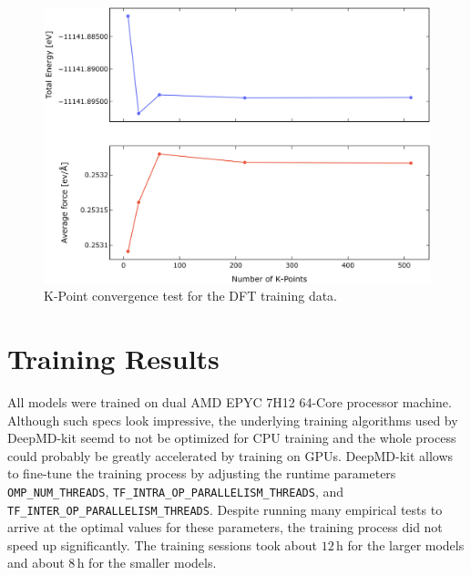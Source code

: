 \begin{figure}
  \begin{center}
    \includegraphics[width=.8\textwidth]{
      asset/kpoint_convergence.jpg
    }
  \end{center}
  \caption{K-Point convergence test for the DFT training data.}
  \label{fig:dft_kpoint_convergence}
\end{figure}

\section{Training Results}

All models were trained on dual AMD EPYC 7H12 64-Core processor machine.
Although such specs look impressive, the underlying training algorithms used
by DeepMD-kit seemd to not be optimized for CPU training and the whole process
could probably be greatly accelerated by training on GPUs. DeepMD-kit allows
to fine-tune the training process by adjusting the runtime parameters
\texttt{OMP\_NUM\_THREADS}, \texttt{TF\_INTRA\_OP\_PARALLELISM\_THREADS},
\linebreak and \texttt{TF\_INTER\_OP\_PARALLELISM\_THREADS}. Despite running
many empirical tests to arrive at the optimal values for these parameters, the
training process did not speed up significantly. The training sessions took
about $12 \, \mathrm{h}$ for the larger models and about $8 \, \mathrm{h}$ for
the smaller models.

